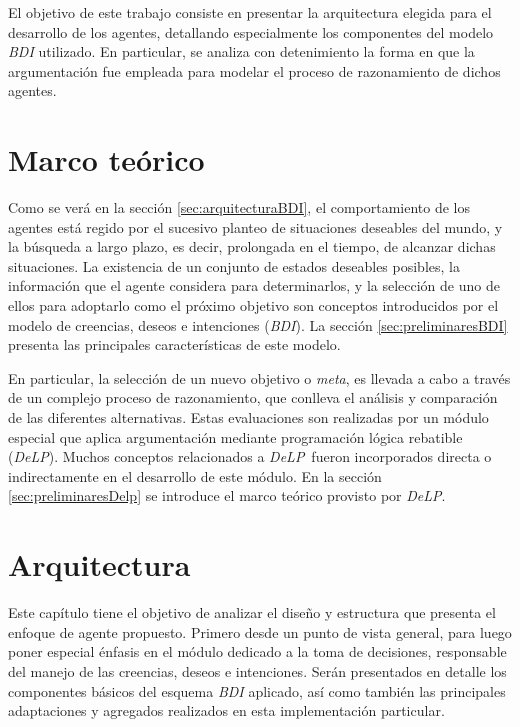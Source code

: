 \documentclass[oneside]{book}
\theoremstyle{definition}
\newcommand{\DLP}{\mbox{\textit{DeLP}}}
\begin{document}
El objetivo de este trabajo consiste en presentar la arquitectura elegida para el 
desarrollo de los agentes, detallando especialmente los componentes del modelo \textit{BDI} 
utilizado. En particular, se analiza con detenimiento la forma en que la argumentación 
fue empleada para modelar el proceso de razonamiento de dichos agentes.
	


\chapter{Marco teórico}

Como se verá en la sección \ref{sec:arquitecturaBDI}, el comportamiento de los 
agentes está regido por el sucesivo planteo de situaciones deseables del 
mundo, y la búsqueda a largo plazo, es decir, prolongada en el tiempo, de 
alcanzar dichas situaciones. La existencia de un conjunto de estados deseables 
posibles, la información que el agente considera para determinarlos, y la 
selección de uno de ellos para adoptarlo como el próximo objetivo son 
conceptos introducidos por el modelo de creencias, deseos e intenciones 
(\textit{BDI}). La sección \ref{sec:preliminaresBDI} presenta las principales 
características de este modelo. 

En particular, la selección de un nuevo objetivo o \textit{meta}, es llevada a cabo
a través de un complejo proceso de razonamiento, que conlleva el análisis y comparación 
de las diferentes alternativas. Estas evaluaciones son realizadas por un módulo especial
que aplica argumentación mediante programación lógica rebatible (\DLP). Muchos conceptos
relacionados a \DLP\ fueron incorporados directa o indirectamente en el desarrollo de este
módulo. En la sección \ref{sec:preliminaresDelp} se introduce el marco teórico provisto
por \DLP.






\chapter{Arquitectura} %

Este capítulo tiene el objetivo de analizar el diseño y estructura que presenta el 
enfoque de agente propuesto. Primero desde un punto de vista general, para luego 
poner especial énfasis en el módulo dedicado a la toma de decisiones, responsable 
del manejo de las creencias, deseos e intenciones. Serán presentados en detalle los 
componentes básicos del esquema \textit{BDI} aplicado, así como también las principales 
adaptaciones y agregados realizados en esta implementación particular.
\end{document}
